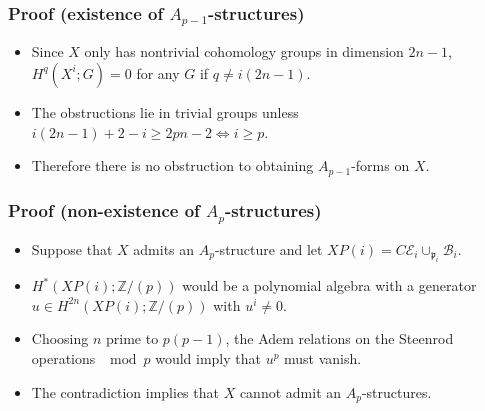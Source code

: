 \documentclass{beamer}
\theoremstyle{definition}
\newcommand{\Z}{\mathbb{Z}}
\begin{document}
\begin{frame}
\frametitle{Proof (existence of $A_{p-1}$-structures)}
\begin{itemize}
\item<1-> Since $X$ only has nontrivial cohomology groups in dimension $2n-1$, $H^q(X^i;G)=0$ for any $G$ if $q\neq i(2n-1)$.
\item<2-> The obstructions lie in trivial groups unless $i(2n-1)+2-i\geq 2pn-2\Leftrightarrow i\geq p$.
\item<3-> Therefore there is no obstruction to obtaining $A_{p-1}$-forms on $X$.
\end{itemize}
\end{frame}
\begin{frame}
\frametitle{Proof (non-existence of $A_{p}$-structures)}
\begin{itemize}
\item<1-> Suppose that $X$ admits an $A_p$-structure and let $XP(i)=C\mathcal{E}_i\cup_{\mathfrak{p}_i}\mathcal{B}_i$.
\item<2-> $H^*(XP(i);\Z/(p))$ would be a polynomial algebra with a generator $u\in H^{2n}(XP(i);\Z/(p))$ with $u^i\neq 0$.
\item<3-> Choosing $n$ prime to $p(p-1)$, the Adem relations on the Steenrod operations $\mod p$ would imply that $u^p$ must vanish. %
\item<4-> The contradiction implies that $X$ cannot admit an $A_{p}$-structures.
\end{itemize}
\end{frame}
\end{document}
